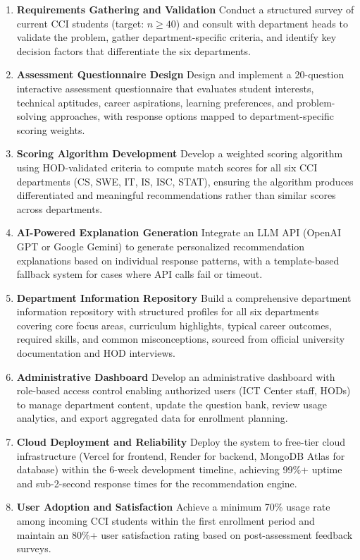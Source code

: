 \documentclass[12pt, a4paper]{article}
\begin{document}
\begin{enumerate}[leftmargin=1.5em, itemsep=4pt]
    \item \textbf{Requirements Gathering and Validation}  
    Conduct a structured survey of current CCI students (target: $n \geq 40$) and consult with department heads to validate the problem, gather department-specific criteria, and identify key decision factors that differentiate the six departments.
    
    \item \textbf{Assessment Questionnaire Design}  
    Design and implement a 20-question interactive assessment questionnaire that evaluates student interests, technical aptitudes, career aspirations, learning preferences, and problem-solving approaches, with response options mapped to department-specific scoring weights.
    
    \item \textbf{Scoring Algorithm Development}  
    Develop a weighted scoring algorithm using HOD-validated criteria to compute match scores for all six CCI departments (CS, SWE, IT, IS, ISC, STAT), ensuring the algorithm produces differentiated and meaningful recommendations rather than similar scores across departments.
    
    \item \textbf{AI-Powered Explanation Generation}  
    Integrate an LLM API (OpenAI GPT or Google Gemini) to generate personalized recommendation explanations based on individual response patterns, with a template-based fallback system for cases where API calls fail or timeout.
    
    \item \textbf{Department Information Repository}  
    Build a comprehensive department information repository with structured profiles for all six departments covering core focus areas, curriculum highlights, typical career outcomes, required skills, and common misconceptions, sourced from official university documentation and HOD interviews.
    
    \item \textbf{Administrative Dashboard}  
    Develop an administrative dashboard with role-based access control enabling authorized users (ICT Center staff, HODs) to manage department content, update the question bank, review usage analytics, and export aggregated data for enrollment planning.
    
    \item \textbf{Cloud Deployment and Reliability}  
    Deploy the system to free-tier cloud infrastructure (Vercel for frontend, Render for backend, MongoDB Atlas for database) within the 6-week development timeline, achieving 99\%+ uptime and sub-2-second response times for the recommendation engine.
    
    \item \textbf{User Adoption and Satisfaction}  
    Achieve a minimum 70\% usage rate among incoming CCI students within the first enrollment period and maintain an 80\%+ user satisfaction rating based on post-assessment feedback surveys.
\end{enumerate}
\end{document}

